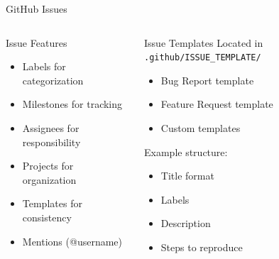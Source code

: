 \documentclass[aspectratio=169]{beamer}
\begin{document}
	\begin{frame}{GitHub Issues}
		\begin{columns}[T]
			\begin{block}{Issue Features}
				\begin{itemize}
					\item Labels for categorization
					\item Milestones for tracking
					\item Assignees for responsibility
					\item Projects for organization
					\item Templates for consistency
					\item Mentions (@username)
				\end{itemize}
			\end{block}
			
			\begin{block}{Issue Templates}
				\small{Located in \texttt{.github/ISSUE\_TEMPLATE/}}\\
				\vspace{0.2cm}
				\begin{itemize}
					\item Bug Report template
					\item Feature Request template
					\item Custom templates
				\end{itemize}
				\vspace{0.3cm}
				Example structure:
				\begin{itemize}
					\item Title format
					\item Labels
					\item Description
					\item Steps to reproduce
				\end{itemize}
			\end{block}
		\end{columns}
	\end{frame}
	
\end{document}
